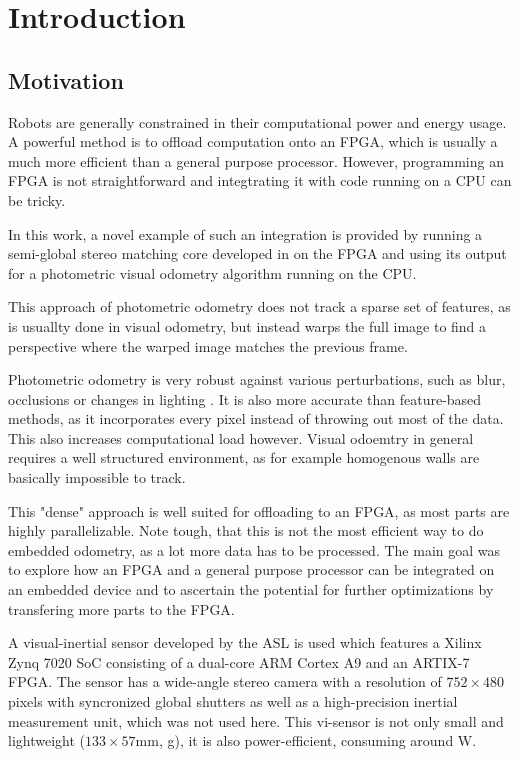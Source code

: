 \chapter{Introduction}
\label{sec:introduction}

\section{Motivation}
\label{sec:motivation}

Robots are generally constrained in their computational power and energy usage.
A powerful method is to offload computation onto an FPGA, which is usually
a much more efficient than a general purpose processor.  However, programming
an FPGA is not straightforward and integtrating it with code running on a CPU
can be tricky.

In this work, a novel example of such an integration is provided by running a
semi-global stereo matching \cite{hirschmuller2005sgm} core developed in
\cite{honegger2014sgmcore} on the FPGA and using its output for a photometric
visual odometry algorithm \cite{comport2007odometry} running on the CPU.

This approach of photometric odometry does not track a sparse set of features,
as is usuallty done in visual odometry, but instead warps the full image to
find a perspective where the warped image matches the previous frame.

Photometric odometry is very robust against various perturbations, such as
blur, occlusions or changes in lighting \cite{comport2011asymmetric}. It is
also more accurate than feature-based methods, as it incorporates every pixel
instead of throwing out most of the data. This also increases computational
load however. Visual odoemtry in general requires a well structured
environment, as for example homogenous walls are basically impossible to track.

This "dense" approach is well suited for offloading to an FPGA, as most parts
are highly parallelizable. Note tough, that this is not the most efficient way
to do embedded odometry, as a lot more data has to be processed. The main goal
was to explore how an FPGA and a general purpose processor can be integrated on
an embedded device and to ascertain the potential for further optimizations by
transfering more parts to the FPGA.

A visual-inertial sensor developed by the ASL \cite{nikolic2014synchronized} is
used which features a Xilinx Zynq 7020 SoC consisting of a dual-core ARM Cortex
A9 and an ARTIX-7 FPGA. The sensor has a wide-angle stereo camera with a
resolution of $752 \times 480$ pixels with syncronized global shutters as well
as a high-precision inertial measurement unit, which was not used here. This
vi-sensor is not only small and lightweight ($133 \times 57$mm, \unit[130]{g}),
it is also power-efficient, consuming around \unit[5]{W}.



